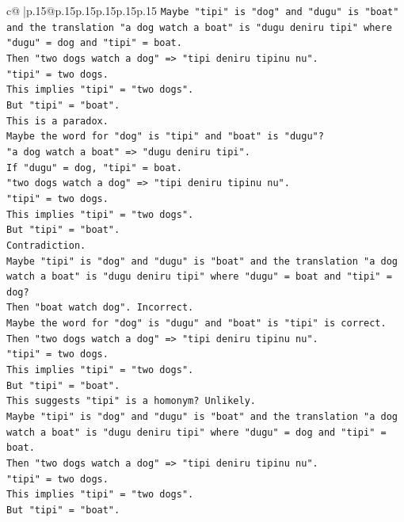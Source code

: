 \documentclass{article}
\begin{document}
{\begin{supertabular}{c@{$\;$}|p{.15\linewidth}@{}p{.15\linewidth}p{.15\linewidth}p{.15\linewidth}p{.15\linewidth}p{.15\linewidth}}
{{{\texttt{Maybe "tipi" is "dog" and "dugu" is "boat" and the translation "a dog watch a boat" is "dugu deniru tipi" where "dugu" = dog and "tipi" = boat.} \\
\texttt{Then "two dogs watch a dog" => "tipi deniru tipinu nu".} \\
\texttt{"tipi" = two dogs.} \\
\texttt{This implies "tipi" = "two dogs".} \\
\texttt{But "tipi" = "boat".} \\
\texttt{This is a paradox.} \\
\texttt{Maybe the word for "dog" is "tipi" and "boat" is "dugu"?} \\
\texttt{"a dog watch a boat" => "dugu deniru tipi".} \\
\texttt{If "dugu" = dog, "tipi" = boat.} \\
\texttt{"two dogs watch a dog" => "tipi deniru tipinu nu".} \\
\texttt{"tipi" = two dogs.} \\
\texttt{This implies "tipi" = "two dogs".} \\
\texttt{But "tipi" = "boat".} \\
\texttt{Contradiction.} \\
\texttt{Maybe "tipi" is "dog" and "dugu" is "boat" and the translation "a dog watch a boat" is "dugu deniru tipi" where "dugu" = boat and "tipi" = dog?} \\
\texttt{Then "boat watch dog". Incorrect.} \\
\texttt{Maybe the word for "dog" is "dugu" and "boat" is "tipi" is correct.} \\
\texttt{Then "two dogs watch a dog" => "tipi deniru tipinu nu".} \\
\texttt{"tipi" = two dogs.} \\
\texttt{This implies "tipi" = "two dogs".} \\
\texttt{But "tipi" = "boat".} \\
\texttt{This suggests "tipi" is a homonym? Unlikely.} \\
\texttt{Maybe "tipi" is "dog" and "dugu" is "boat" and the translation "a dog watch a boat" is "dugu deniru tipi" where "dugu" = dog and "tipi" = boat.} \\
\texttt{Then "two dogs watch a dog" => "tipi deniru tipinu nu".} \\
\texttt{"tipi" = two dogs.} \\
\texttt{This implies "tipi" = "two dogs".} \\
\texttt{But "tipi" = "boat".} \\
}}}
\end{supertabular}}
\end{document}
